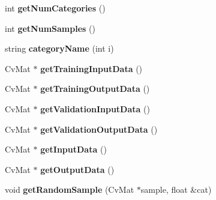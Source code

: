 \begin{DoxyCompactItemize}
\item 
\hypertarget{class_m_l_data_a38fe7db4f2dae1661064205e0a6878af}{int {\bfseries get\-Num\-Categories} ()}\label{class_m_l_data_a38fe7db4f2dae1661064205e0a6878af}

\item 
\hypertarget{class_m_l_data_aac7550c01b65a1c5d8ed507747a04a8b}{int {\bfseries get\-Num\-Samples} ()}\label{class_m_l_data_aac7550c01b65a1c5d8ed507747a04a8b}

\item 
\hypertarget{class_m_l_data_a31914b82de776f902052f1213efa896b}{string {\bfseries category\-Name} (int i)}\label{class_m_l_data_a31914b82de776f902052f1213efa896b}

\item 
\hypertarget{class_m_l_data_aa4b8995b0a97a1faf7b2258f86408f83}{Cv\-Mat $\ast$ {\bfseries get\-Training\-Input\-Data} ()}\label{class_m_l_data_aa4b8995b0a97a1faf7b2258f86408f83}

\item 
\hypertarget{class_m_l_data_ac9e06876eae95f366ef51188a48b6a3f}{Cv\-Mat $\ast$ {\bfseries get\-Training\-Output\-Data} ()}\label{class_m_l_data_ac9e06876eae95f366ef51188a48b6a3f}

\item 
\hypertarget{class_m_l_data_a5ec198b6c3f692964aa9689accf5285c}{Cv\-Mat $\ast$ {\bfseries get\-Validation\-Input\-Data} ()}\label{class_m_l_data_a5ec198b6c3f692964aa9689accf5285c}

\item 
\hypertarget{class_m_l_data_a439138752754f0c033cc1ff3e667d1df}{Cv\-Mat $\ast$ {\bfseries get\-Validation\-Output\-Data} ()}\label{class_m_l_data_a439138752754f0c033cc1ff3e667d1df}

\item 
\hypertarget{class_m_l_data_a787d53de79ee63d2b3e9093aca02240b}{Cv\-Mat $\ast$ {\bfseries get\-Input\-Data} ()}\label{class_m_l_data_a787d53de79ee63d2b3e9093aca02240b}

\item 
\hypertarget{class_m_l_data_a32df894be857548ce30aac4703050a32}{Cv\-Mat $\ast$ {\bfseries get\-Output\-Data} ()}\label{class_m_l_data_a32df894be857548ce30aac4703050a32}

\item 
\hypertarget{class_m_l_data_ae2b83af78f54a4304db5514516e5e691}{void {\bfseries get\-Random\-Sample} (Cv\-Mat $\ast$sample, float \&cat)}\label{class_m_l_data_ae2b83af78f54a4304db5514516e5e691}


\end{DoxyCompactItemize}
